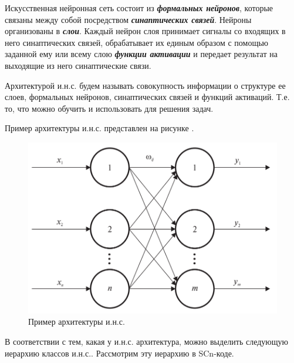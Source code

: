 Искусственная нейронная сеть состоит из \textbf{\textit{формальных нейронов}}, которые связаны между собой посредством \textbf{\textit{синаптических связей}}. Нейроны организованы в \textbf{\textit{слои}}. Каждый нейрон слоя принимает сигналы со входящих в него синаптических связей, обрабатывает их единым образом с помощью заданной ему или всему слою \textbf{\textit{функции активации}} и передает результат на выходящие из него синаптические связи.

Архитектурой и.н.с. будем называть совокупность информации о структуре ее слоев, формальных нейронов, синаптических связей и функций активаций. Т.е. то, что можно обучить и использовать для решения задач.

Пример архитектуры и.н.с. представлен на рисунке \textit{}.

\begin{figure}[H]
	\centering
	\includegraphics[scale=0.3]{author/part3/figures/neural_network.png}
	\caption{Пример архитектуры и.н.с.}
	\label{fig:nn_example}
\end{figure}

В соответствии с тем, какая у и.н.с. архитектура, можно выделить следующую иерархию классов и.н.с.. Рассмотрим эту иерархию в SCn-коде.

